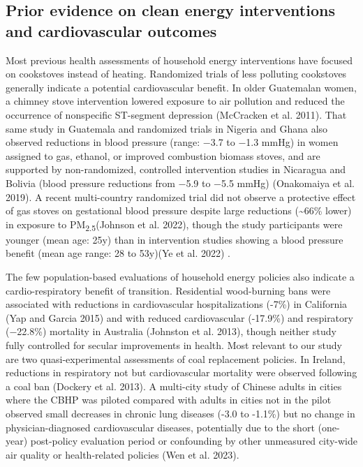\documentclass[
  letterpaper,
  DIV=11,
  numbers=noendperiod]{scrartcl}
\begin{document}
\hypertarget{prior-evidence-on-clean-energy-interventions-and-cardiovascular-outcomes}{%
\subsection{Prior evidence on clean energy interventions and
cardiovascular
outcomes}\label{prior-evidence-on-clean-energy-interventions-and-cardiovascular-outcomes}}

Most previous health assessments of household energy interventions have
focused on cookstoves instead of heating. Randomized trials of less
polluting cookstoves generally indicate a potential cardiovascular
benefit. In older Guatemalan women, a chimney stove intervention lowered
exposure to air pollution and reduced the occurrence of nonspecific
ST-segment depression (McCracken et al. 2011). That same study in
Guatemala and randomized trials in Nigeria and Ghana also observed
reductions in blood pressure (range: −3.7 to −1.3 mmHg) in women
assigned to gas, ethanol, or improved combustion biomass stoves, and are
supported by non-randomized, controlled intervention studies in
Nicaragua and Bolivia (blood pressure reductions from −5.9 to −5.5 mmHg)
(Onakomaiya et al. 2019). A recent multi-country randomized trial did
not observe a protective effect of gas stoves on gestational blood
pressure despite large reductions (\textasciitilde66\% lower) in
exposure to PM\textsubscript{2.5}(Johnson et al. 2022), though the study
participants were younger (mean age: 25y) than in intervention studies
showing a blood pressure benefit (mean age range: 28 to 53y)(Ye et al.
2022) .

The few population-based evaluations of household energy policies also
indicate a cardio-respiratory benefit of transition. Residential
wood-burning bans were associated with reductions in cardiovascular
hospitalizations (-7\%) in California (Yap and Garcia 2015) and with
reduced cardiovascular (-17.9\%) and respiratory (−22.8\%) mortality in
Australia (Johnston et al. 2013), though neither study fully controlled
for secular improvements in health. Most relevant to our study are two
quasi-experimental assessments of coal replacement policies. In Ireland,
reductions in respiratory not but cardiovascular mortality were observed
following a coal ban (Dockery et al. 2013). A multi-city study of
Chinese adults in cities where the CBHP was piloted compared with adults
in cities not in the pilot observed small decreases in chronic lung
diseases (-3.0 to -1.1\%) but no change in physician-diagnosed
cardiovascular diseases, potentially due to the short (one-year)
post-policy evaluation period or confounding by other unmeasured
city-wide air quality or health-related policies (Wen et al. 2023).
\end{document}
